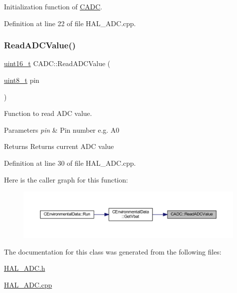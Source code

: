 Initialization function of \mbox{\hyperlink{class_c_a_d_c}{C\+A\+DC}}. 



Definition at line 22 of file H\+A\+L\+\_\+\+A\+D\+C.\+cpp.

\mbox{\label{class_c_a_d_c_ac2f897fc64f605751ac3ffe7d2704ba6}} 
\subsubsection{\texorpdfstring{ReadADCValue()}{ReadADCValue()}}
{\footnotesize\ttfamily \mbox{\hyperlink{_a_d_a_s___types_8h_a1f1825b69244eb3ad2c7165ddc99c956}{uint16\+\_\+t}} C\+A\+D\+C\+::\+Read\+A\+D\+C\+Value (\begin{DoxyParamCaption}\item[{\mbox{\hyperlink{_a_d_a_s___types_8h_aba7bc1797add20fe3efdf37ced1182c5}{uint8\+\_\+t}}}]{pin }\end{DoxyParamCaption})}



Function to read A\+DC value. 


\begin{DoxyParams}{Parameters}
{\em pin} & Pin number e.\+g. A0 \\
\hline
\end{DoxyParams}
\begin{DoxyReturn}{Returns}
Returns current A\+DC value 
\end{DoxyReturn}


Definition at line 30 of file H\+A\+L\+\_\+\+A\+D\+C.\+cpp.

Here is the caller graph for this function\+:\nopagebreak
\begin{figure}[H]
\begin{center}
\leavevmode
\includegraphics[width=350pt]{class_c_a_d_c_ac2f897fc64f605751ac3ffe7d2704ba6_icgraph}
\end{center}
\end{figure}


The documentation for this class was generated from the following files\+:\begin{DoxyCompactItemize}
\item 
\mbox{\hyperlink{_h_a_l___a_d_c_8h}{H\+A\+L\+\_\+\+A\+D\+C.\+h}}\item 
\mbox{\hyperlink{_h_a_l___a_d_c_8cpp}{H\+A\+L\+\_\+\+A\+D\+C.\+cpp}}\end{DoxyCompactItemize}
